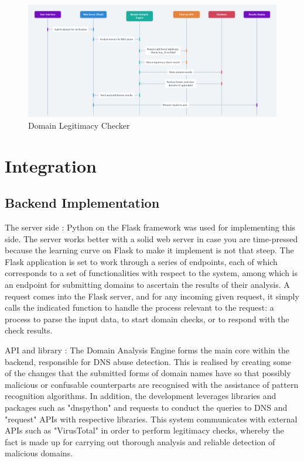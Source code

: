 \begin{figure}[H]
\captionsetup{font= footnotesize}
    \centering
    \includegraphics[width=1\linewidth]{project/DNS Abuse Transparency System.png}
    \caption{Domain Legitimacy Checker}
    \label{fig:figfig}
\end{figure}

\section{Integration} 
\subsection{Backend Implementation}

The server side :   Python on the Flask framework was used for implementing this side. The server works better with a solid web server in case you are time-pressed because the learning curve on Flask to make it implement is not that steep. The Flask application is set to work through a series of endpoints, each of which corresponds to a set of functionalities with respect to the system, among which is an endpoint for submitting domains to ascertain the results of their analysis. A request comes into the Flask server, and for any incoming given request, it simply calls the indicated function to handle the process relevant to the request: a process to parse the input data, to start domain checks, or to respond with the check results.

 API and library : The Domain Analysis Engine forms the main core within the backend, responsible for DNS abuse detection. This is realised by creating some of the changes that the submitted forms of domain names have so that possibly malicious or confusable counterparts are recognised with the assistance of pattern recognition algorithms. In addition, the development leverages libraries and packages such as "dnspython" and requests to conduct the queries to DNS and "request" APIs with respective libraries. This system communicates with external APIs such as "VirusTotal" in order to perform legitimacy checks, whereby the fact is made up for carrying out thorough analysis and reliable detection of malicious domains.

